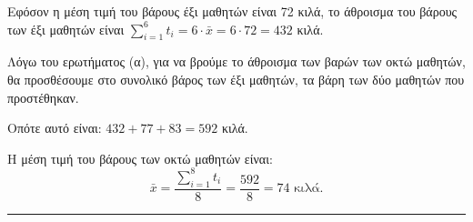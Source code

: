 
\begin{alist}
    \item Εφόσον η μέση τιμή του βάρους έξι μαθητών είναι 72 κιλά, το άθροισμα του βάρους των έξι μαθητών είναι $\sum_{i=1}^{6} t_i = 6 \cdot \bar{x} = 6 \cdot 72 = 432$ κιλά.
    \item 
    \begin{rlist}
        \item Λόγω του ερωτήματος (α), για να βρούμε το άθροισμα των βαρών των οκτώ μαθητών, θα προσθέσουμε στο συνολικό βάρος των έξι μαθητών, τα βάρη των δύο μαθητών που προστέθηκαν.

        Οπότε αυτό είναι: $432+77+83=592$ κιλά.
        \item Η μέση τιμή του βάρους των οκτώ μαθητών είναι:
        \[ \bar{x} = \frac{\sum_{i=1}^{8} t_i}{8} = \frac{592}{8} = 74 \text{ κιλά.} \]
    \end{rlist}
\end{alist}
\vspace{6mm}
\noindent\rule{\textwidth}{0.4pt}
\vspace{6mm}

